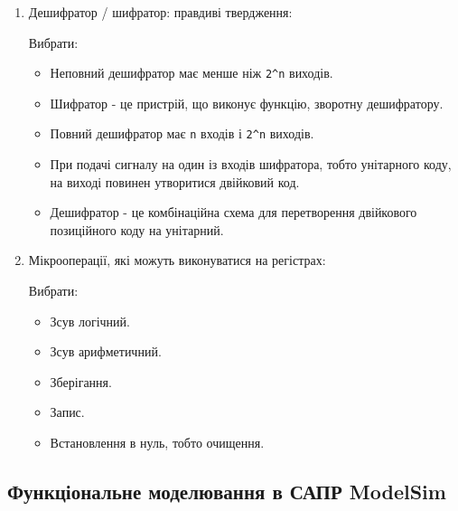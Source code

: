 \documentclass[
  11pt,
]{article}
\providecommand{\tightlist}{%
  \setlength{\itemsep}{0pt}\setlength{\parskip}{0pt}}
\begin{document}
\begin{enumerate}
  \texttt{Ланцюга\ із\ восьми\ повних\ однобітних\ суматорів}.
\item
  Дешифратор / шифратор: правдиві твердження:

  Вибрати:

  \begin{itemize}
  \tightlist
  \item
    Неповний дешифратор має менше ніж \texttt{2\^{}n} виходів.
  \item
    Шифратор - це пристрій, що виконує функцію, зворотну дешифратору.
  \item
    Повний дешифратор має \texttt{n} входів і \texttt{2\^{}n} виходів.
  \item
    При подачі сигналу на один із входів шифратора, тобто унітарного коду, на виході повинен утворитися двійковий код.
  \item
    Дешифратор - це комбінаційна схема для перетворення двійкового позиційного коду на унітарний.
  \end{itemize}
\item
  Мікрооперації, які можуть виконуватися на регістрах:

  Вибрати:

  \begin{itemize}
  \tightlist
  \item
    Зсув логічний.
  \item
    Зсув арифметичний.
  \item
    Зберігання.
  \item
    Запис.
  \item
    Встановлення в нуль, тобто очищення.
  \end{itemize}
\end{enumerate}

\subsection{Функціональне моделювання в САПР ModelSim}\label{ux444ux443ux43dux43aux446ux456ux43eux43dux430ux43bux44cux43dux435-ux43cux43eux434ux435ux43bux44eux432ux430ux43dux43dux44f-ux432-ux441ux430ux43fux440-modelsim}
\end{document}
